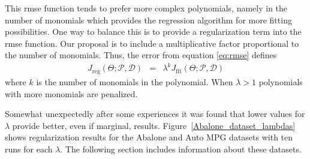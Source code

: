 \documentclass[draft,authoryear,3p,times,twocolumn]{elsarticle}
\begin{document}
This \ac{rmse} function tends to prefer more complex polynomials, namely in the number of monomials which provides the regression algorithm for more fitting possibilities. One way to balance this is to provide a regularization term into the \ac{rmse} function. Our proposal is to include a multiplicative factor proportional to the number of monomials. Thus, the error from equation \ref{eq:rmse} defines
\begin{eqnarray}
J_{\textrm{reg}}\left(\Theta;\mathcal{P},\mathcal{D}\right) &=& \lambda^{k} J_{\textrm{fit}}\left(\Theta;\mathcal{P},\mathcal{D}\right)\label{eq:rmse-reg}
\end{eqnarray}
%
where $k$ is the number of monomials in the polynomial. When $\lambda > 1$ polynomials with more monomials are penalized.

Somewhat unexpectedly after some experiences it was found that lower values for $\lambda$ provide better, even if marginal, results. Figure~\ref{Abalone_dataset_lambdas} shows regularization results for the Abalone and Auto MPG datasets with ten runs for each $\lambda$. The following section  includes information about these datasets.
\end{document}
